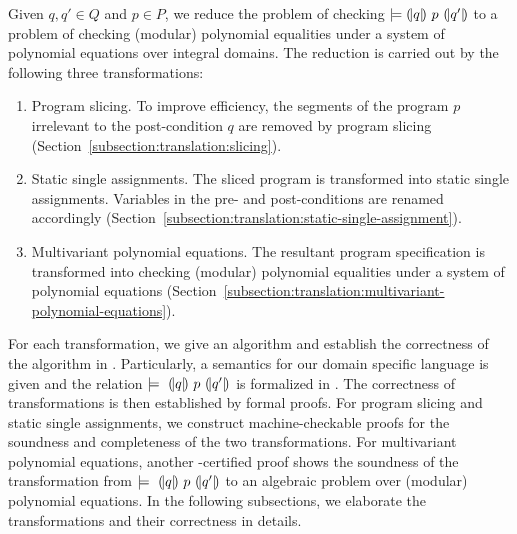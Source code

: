 
Given $q, q' \in Q$ and $p \in P$, we reduce the problem of checking
$\models {(\!|}{q}{|\!)}~{p}~{(\!|}{q'}{|\!)}$ to a problem of checking (modular)
polynomial equalities under a system of polynomial equations over
integral domains. The reduction is carried out by the following three
transformations:
\begin{enumerate}
\item Program slicing. To improve efficiency, the segments of the program $p$
  irrelevant to the post-condition $q$ are removed by program slicing 
  (Section~\ref{subsection:translation:slicing}). 
\item Static single assignments. The sliced program is transformed
  into static single assignments. Variables in the pre- and
  post-conditions are renamed accordingly
  (Section~\ref{subsection:translation:static-single-assignment}).
\item Multivariant polynomial equations. The resultant program
  specification is transformed into checking (modular)
  polynomial equalities under a system of polynomial equations
  (Section~\ref{subsection:translation:multivariant-polynomial-equations}).
\end{enumerate}

For each transformation, we give an algorithm and establish the
correctness of the algorithm in \coq. Particularly, a semantics
for our domain specific language is given and the relation 
$\models~{(\!|}{q}{|\!)}~{p}~{(\!|}{q'}{|\!)}$ is formalized in \coq. The
correctness of transformations is then established by formal \coq
proofs. For program slicing and static single assignments, we
construct machine-checkable proofs for the soundness and completeness
of the two transformations. For multivariant polynomial equations,
another \coq-certified proof shows the soundness of the transformation
from $\models~{(\!|}{q}{|\!)}~{p}~{(\!|}{q'}{|\!)}$ to an algebraic problem over
(modular) polynomial equations. In the following subsections, we
elaborate the transformations and their correctness in details.